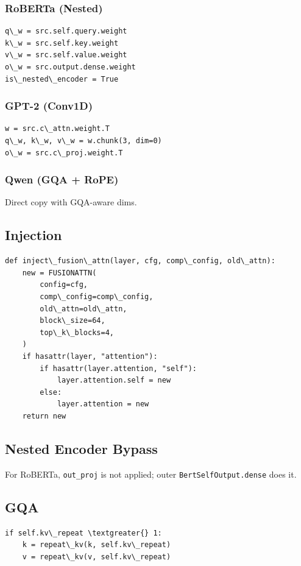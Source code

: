 \subsubsection{RoBERTa (Nested)}
\begin{lstlisting}
q\_w = src.self.query.weight
k\_w = src.self.key.weight
v\_w = src.self.value.weight
o\_w = src.output.dense.weight
is\_nested\_encoder = True
\end{lstlisting}

\subsubsection{GPT-2 (Conv1D)}
\begin{lstlisting}
w = src.c\_attn.weight.T
q\_w, k\_w, v\_w = w.chunk(3, dim=0)
o\_w = src.c\_proj.weight.T
\end{lstlisting}

\subsubsection{Qwen (GQA + RoPE)}
Direct copy with GQA-aware dims.

\subsection{Injection}

\begin{lstlisting}
def inject\_fusion\_attn(layer, cfg, comp\_config, old\_attn):
    new = FUSIONATTN(
        config=cfg,
        comp\_config=comp\_config,
        old\_attn=old\_attn,
        block\_size=64,
        top\_k\_blocks=4,
    )
    if hasattr(layer, "attention"):
        if hasattr(layer.attention, "self"):
            layer.attention.self = new
        else:
            layer.attention = new
    return new
\end{lstlisting}

\subsection{Nested Encoder Bypass}

For RoBERTa, \texttt{out\_proj} is not applied; outer \texttt{BertSelfOutput.dense} does it.

\subsection{GQA}

\begin{lstlisting}
if self.kv\_repeat \textgreater{} 1:
    k = repeat\_kv(k, self.kv\_repeat)
    v = repeat\_kv(v, self.kv\_repeat)
\end{lstlisting}

